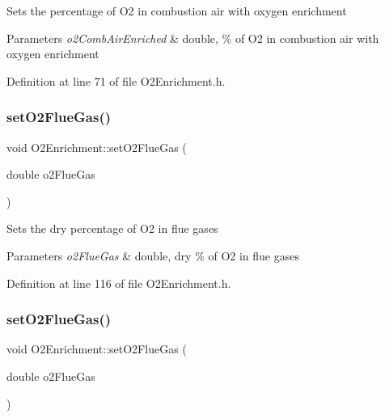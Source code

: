 Sets the percentage of O2 in combustion air with oxygen enrichment 
\begin{DoxyParams}{Parameters}
{\em o2\+Comb\+Air\+Enriched} & double, \% of O2 in combustion air with oxygen enrichment \\
\hline
\end{DoxyParams}


Definition at line 71 of file O2\+Enrichment.\+h.

\mbox{\label{class_o2_enrichment_aef67aa13531717c0d1832921ce6d27ae}} 
\subsubsection{\texorpdfstring{set\+O2\+Flue\+Gas()}{setO2FlueGas()}\hspace{0.1cm}{\footnotesize\ttfamily [1/3]}}
{\footnotesize\ttfamily void O2\+Enrichment\+::set\+O2\+Flue\+Gas (\begin{DoxyParamCaption}\item[{double}]{o2\+Flue\+Gas }\end{DoxyParamCaption})\hspace{0.3cm}{\ttfamily [inline]}}

Sets the dry percentage of O2 in flue gases 
\begin{DoxyParams}{Parameters}
{\em o2\+Flue\+Gas} & double, dry \% of O2 in flue gases \\
\hline
\end{DoxyParams}


Definition at line 116 of file O2\+Enrichment.\+h.

\mbox{\label{class_o2_enrichment_aef67aa13531717c0d1832921ce6d27ae}} 
\subsubsection{\texorpdfstring{set\+O2\+Flue\+Gas()}{setO2FlueGas()}\hspace{0.1cm}{\footnotesize\ttfamily [2/3]}}
{\footnotesize\ttfamily void O2\+Enrichment\+::set\+O2\+Flue\+Gas (\begin{DoxyParamCaption}\item[{double}]{o2\+Flue\+Gas }\end{DoxyParamCaption})\hspace{0.3cm}{\ttfamily [inline]}}

